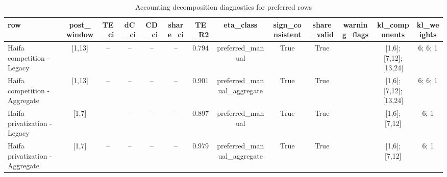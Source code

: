 \begin{table}[!htbp]
  \centering
  \caption{Accounting decomposition diagnostics for preferred rows}
  \label{tab:model2\_diagnostics}
  \scriptsize
  \begin{tabular}{lcccccccccccc}
    \toprule
    row & post\_window & TE\_ci & dC\_ci & CD\_ci & share\_ci & TE\_R2 & eta\_class & sign\_consistent & share\_valid & warning\_flags & kl\_components & kl\_weights \\
    \midrule
    Haifa competition - Legacy & [1,13] & -- & -- & -- & -- & 0.794 & preferred\_manual & True & True &  & [1,6]; [7,12]; [13,24] & 6; 6; 1 \\
    Haifa competition - Aggregate & [1,13] & -- & -- & -- & -- & 0.901 & preferred\_manual\_aggregate & True & True &  & [1,6]; [7,12]; [13,24] & 6; 6; 1 \\
    Haifa privatization - Legacy & [1,7] & -- & -- & -- & -- & 0.897 & preferred\_manual & True & True &  & [1,6]; [7,12] & 6; 1 \\
    Haifa privatization - Aggregate & [1,7] & -- & -- & -- & -- & 0.979 & preferred\_manual\_aggregate & True & True &  & [1,6]; [7,12] & 6; 1 \\
    \bottomrule
  \end{tabular}
\end{table}
